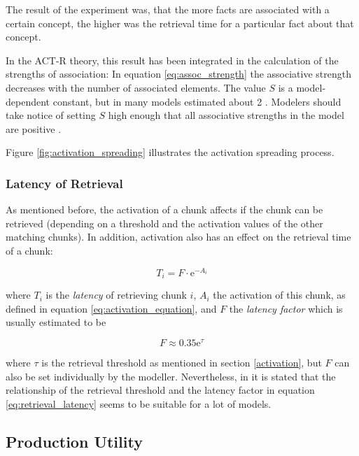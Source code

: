 The result of the experiment was, that the more facts are associated with a certain concept, the higher was the retrieval time for a particular fact about that concept.

In the ACT-R theory, this result has been integrated in the calculation of the strengths of association: In equation \eqref{eq:assoc_strength} the associative strength decreases with the number of associated elements. The value $S$ is a model-dependent constant, but in many models estimated about 2 \cite[p. 1042]{anderson_integrated_2004}. Modelers should take notice of setting $S$ high enough that all associative strengths in the model are positive \cite[unit 5, p. 3]{actr_tutorial}.

Figure \ref{fig:activation_spreading} illustrates the activation spreading process.

\subsubsection{Latency of Retrieval}

As mentioned before, the activation of a chunk affects if the chunk can be retrieved (depending on a threshold and the activation values of the other matching chunks). In addition, activation also has an effect on the retrieval time of a chunk:

\begin{equation}
\label{eq:retrieval_latency}
T_i = F \cdot \mathrm{e}^{-A_i}
\end{equation}

where $T_i$ is the \emph{latency} of retrieving chunk $i$, $A_i$ the activation of this chunk, as defined in equation \eqref{eq:activation_equation}, and $F$ the \emph{latency factor} which is usually estimated to be

\begin{equation}
F \approx 0.35\mathrm{e}^\tau
\end{equation}

where $\tau$ is the retrieval threshold as mentioned in section \ref{activation}, but $F$ can also be set individually by the modeller. Nevertheless, in \cite[p. 1042]{anderson_integrated_2004} it is stated that the relationship of the retrieval threshold and the latency factor in equation \eqref{eq:retrieval_latency} seems to be suitable for a lot of models.

\subsection{Production Utility}

